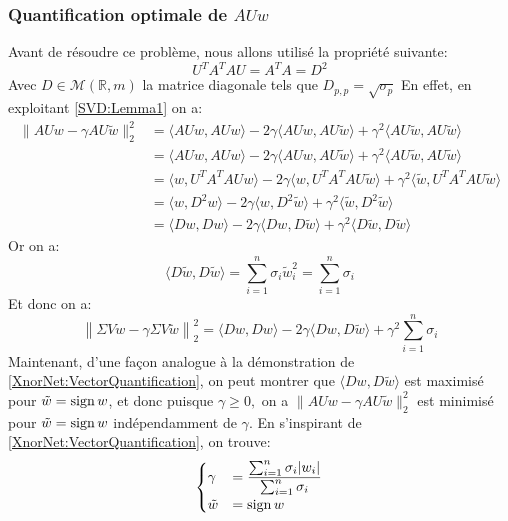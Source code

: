 \subsubsection{Quantification optimale de $A U w$ }
Avant de résoudre ce problème, nous allons utilisé la propriété suivante:
\begin{equation} \label{SVD:Lemma1}
	U^TA^TA U = A^TA = D ^2
\end{equation}
Avec $D \in\mathcal{M}(\mathbb{R},m)$ la matrice diagonale tels que $D_{p,p}=\sqrt{\sigma_p}$
\newline En effet, en exploitant \eqref{SVD:Lemma1} on a:
\begin{align*}
	\lVert A U w -  \gamma A U \tilde{w} \rVert_2^2 &= \langle A U w,A U w \rangle - 2\gamma \langle A U w, A U \tilde{w} \rangle + \gamma ^2\langle A U \tilde{w},A U \tilde{w} \rangle \\
	&= \langle A U w,A U w \rangle - 2\gamma \langle A U w, A U \tilde{w} \rangle + \gamma ^2\langle A U \tilde{w},A U \tilde{w} \rangle \\
	&= \langle  w,U^TA ^T A U w \rangle - 2\gamma \langle  w, U^TA ^TA U \tilde{w} \rangle + \gamma ^2\langle  \tilde{w},U^TA^T A U \tilde{w} \rangle \\
	&= \langle  w,D^2  w \rangle - 2\gamma \langle  w, D^2 \tilde{w} \rangle + \gamma ^2\langle  \tilde{w},D^2 \tilde{w} \rangle  \\
	&=\langle  D w,D  w \rangle - 2\gamma \langle  D w, D \tilde{w} \rangle + \gamma ^2\langle  D \tilde{w},D \tilde{w} \rangle
\end{align*}
Or on a:
\begin{equation*}
	\langle  D\tilde{w},D \tilde{w} \rangle  = \sum_{i=1}^n \sigma_i \tilde{w}_i^2 = \sum_{i=1}^n \sigma_i
\end{equation*}
Et donc on a:
\begin{equation*}
	\left\lVert \Sigma V w -  \gamma \Sigma V \tilde{w} \right\rVert_2^2 =  \langle  D w,D  w \rangle - 2\gamma \langle  D w, D \tilde{w} \rangle + \gamma ^2\sum_{i=1}^n \sigma_i
\end{equation*}
Maintenant, d'une façon analogue à la démonstration de \ref{XnorNet:VectorQuantification}, on peut montrer que $\langle D w,D \tilde{w} \rangle$ est maximisé pour $\tilde{w} = \operatorname{sign} w$, et donc puisque $\gamma \ge 0,$ on a $	\lVert A U w -  \gamma A U \tilde{w} \rVert_2^2$ est minimisé pour $\tilde{w}=\operatorname{sign} w$ indépendamment de $\gamma.$
\newline En s'inspirant de \ref{XnorNet:VectorQuantification}, on trouve:
\begin{equation} \label{XnorNet:TransformetVectorQuantification:Result}
	\begin{cases}
		\gamma &= \dfrac{\sum_{i=1}^n \sigma_i \lvert w_i \rvert }{\sum_{i=1}^n \sigma_i}\\
		\tilde{w} &= \operatorname{sign} w 
	\end{cases}
\end{equation}
